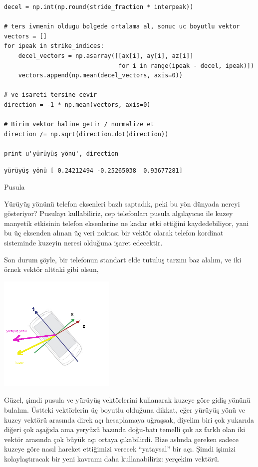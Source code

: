 \documentclass[12pt,fleqn]{article}\usepackage{../../common}
\begin{document}
\begin{verbatim}
decel = np.int(np.round(stride_fraction * interpeak))

# ters ivmenin oldugu bolgede ortalama al, sonuc uc boyutlu vektor
vectors = []
for ipeak in strike_indices:
    decel_vectors = np.asarray([[ax[i], ay[i], az[i]]
                                for i in range(ipeak - decel, ipeak)])
    vectors.append(np.mean(decel_vectors, axis=0))

# ve isareti tersine cevir
direction = -1 * np.mean(vectors, axis=0)

# Birim vektor haline getir / normalize et
direction /= np.sqrt(direction.dot(direction))

print u'yürüyüş yönü', direction
\end{verbatim}

\begin{verbatim}
yürüyüş yönü [ 0.24212494 -0.25265038  0.93677281]
\end{verbatim}

Pusula

Yürüyüş yönünü telefon eksenleri bazlı saptadık, peki bu yön dünyada nereyi
gösteriyor? Pusulayı kullabiliriz, cep telefonları pusula algılayıcısı ile
kuzey manyetik etkisinin telefon eksenlerine ne kadar etki ettiğini
kaydedebiliyor, yani bu üç eksenden alınan üç veri noktası bir vektör
olarak telefon kordinat sisteminde kuzeyin neresi olduğuna işaret
edecektir.

Son durum şöyle, bir telefonun standart elde tutuluş tarzını baz alalım, ve
iki örnek vektör alttaki gibi olsun,

\includegraphics[width=15em]{compscieng_app40walk_14.png}

Güzel, şimdi pusula ve yürüyüş vektörlerini kullanarak kuzeye göre gidiş
yönünü bulalım. Üstteki vektörlerin üç boyutlu olduğuna dikkat, eğer
yürüyüş yönü ve kuzey vektörü arasında direk açı hesaplamaya uğraşsak,
diyelim biri çok yukarıda diğeri çok aşağıda ama yeryüzü bazında doğu-batı
temelli çok az farklı olan iki vektör arasında çok büyük açı ortaya
çıkabilirdi. Bize aslında gereken sadece kuzeye göre nasıl hareket
ettiğimizi verecek ``yataysal'' bir açı. Şimdi işimizi kolaylaştıracak bir
yeni kavramı daha kullanabiliriz: yerçekim vektörü. 
\end{document}
